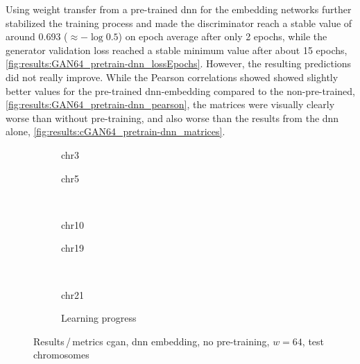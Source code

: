 Using weight transfer from a pre-trained \acrshort{dnn} for the embedding networks further stabilized the training process 
and made the discriminator reach a stable value of around 0.693 ($\approx -\log0.5$) on epoch average after only 2 epochs, 
while the generator validation loss reached a stable minimum value after about 15 epochs, \cref{fig:results:GAN64_pretrain-dnn_lossEpochs}.
However, the resulting predictions did not really improve.
While the Pearson correlations showed showed slightly better values for the pre-trained \acrshort{dnn}-embedding compared to the non-pre-trained, \cref{fig:results:GAN64_pretrain-dnn_pearson},
the matrices were visually clearly worse than without pre-training, and also worse than the results from the \acrshort{dnn} alone, \cref{fig:results:cGAN64_pretrain-dnn_matrices}.

\begin{figure}[p] %
    \begin{subfigure}{0.45\textwidth}
        \scriptsize
        \caption{chr3}
    \end{subfigure} \hfill
    \begin{subfigure}{0.45\textwidth}
        \scriptsize
        \caption{chr5}
    \end{subfigure}\\[5mm]
    \begin{subfigure}{0.45\textwidth}
        \scriptsize
        \caption{chr10}
    \end{subfigure}\hfill
    \begin{subfigure}{0.45\textwidth}
        \scriptsize
        \caption{chr19}
    \end{subfigure}\\[3mm]
    \begin{subfigure}{0.45\textwidth}
        \scriptsize
        \caption{chr21}
    \end{subfigure} \hfill
    \begin{subfigure}{0.45\textwidth}
        \scriptsize
        \caption{Learning progress} \label{fig:results:GAN64-dnn_lossEpochs}
    \end{subfigure}
    \caption{Results\,/\,metrics \acrshort{cgan}, \acrshort{dnn} embedding, no pre-training, $w=64$, test chromosomes}   \label{fig:results:GAN64-dnn_pearson}
\end{figure}
